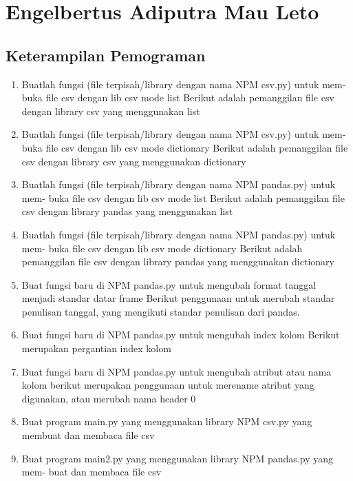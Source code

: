 \section{Engelbertus Adiputra Mau Leto}
 \subsection{Keterampilan Pemograman}
\begin{enumerate}
    \item Buatlah fungsi (file terpisah/library dengan nama NPM csv.py) untuk mem-
    buka file csv dengan lib csv mode list
    Berikut adalah pemanggilan file csv dengan library csv yang menggunakan list
    
    \item Buatlah fungsi (file terpisah/library dengan nama NPM csv.py) untuk mem-
    buka file csv dengan lib csv mode dictionary
    Berikut adalah pemanggilan file csv dengan library csv yang menggunakan dictionary
    
    \item Buatlah fungsi (file terpisah/library dengan nama NPM pandas.py) untuk mem-
    buka file csv dengan lib csv mode list
    Berikut adalah pemanggilan file csv dengan library pandas yang menggunakan list
    
    \item Buatlah fungsi (file terpisah/library dengan nama NPM pandas.py) untuk mem-
    buka file csv dengan lib csv mode dictionary
    Berikut adalah pemanggilan file csv dengan library pandas yang menggunakan dictionary
    
    \item Buat fungsi baru di NPM pandas.py untuk mengubah format tanggal menjadi
    standar datar frame
    Berikut penggunaan untuk merubah standar penulisan tanggal, yang mengikuti standar penulisan dari pandas.
    
    \item Buat fungsi baru di NPM pandas.py untuk mengubah index kolom
    Berikut merupakan pergantian index kolom
    
    \item Buat fungsi baru di NPM pandas.py untuk mengubah atribut atau nama kolom
    berikut merupakan penggunaan untuk merename atribut yang digunakan, atau merubah nama header 0
    
    \item Buat program main.py yang menggunakan library NPM csv.py yang membuat
    dan membaca file csv
    
    \item Buat program main2.py yang menggunakan library NPM pandas.py yang mem-
    buat dan membaca file csv
    


\end{enumerate}

